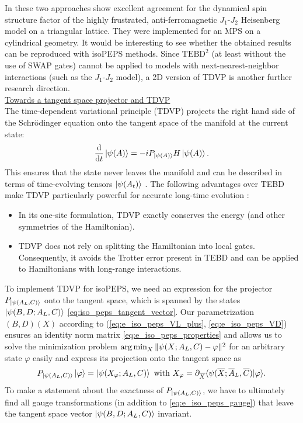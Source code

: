 In \cite{drescher2023dynamical} these two approaches show excellent agreement for the dynamical spin structure factor of the highly frustrated, anti-ferromagnetic $J_1$-$J_2$ Heisenberg model on a triangular lattice. They were implemented for an MPS on a cylindrical geometry. It would be interesting to see whether the obtained results can be reproduced with isoPEPS methods. Since $\text{TEBD}^2$ (at least without the use of SWAP gates) cannot be applied to models with next-nearest-neighbor interactions (such as the $J_1$-$J_2$ model), a 2D version of TDVP is another further research direction. \\[1em]

\noindent \underline{Towards a tangent space projector and TDVP} \\[0.5em]
The time-dependent variational principle (TDVP) projects the right hand side of the Schrödinger equation onto the tangent space of the manifold at the current state:
\begin{equation}
	\frac{\mathrm{d}}{\mathrm{d}t} \ket{\psi(A)} = -i P_{\ket{\psi(A)}} H \ket{\psi(A)}.
\end{equation}
This ensures that the state never leaves the manifold and can be described in terms of time-evolving tensors $\ket{\psi(A_t)}$ \cite{haegeman2016unifying}. The following advantages over TEBD make TDVP particularly powerful for accurate long-time evolution \cite{haegeman2013post}:
\begin{itemize}
	\item In its one-site formulation, TDVP exactly conserves the energy (and other symmetries of the Hamiltonian).
	\item TDVP does not rely on splitting the Hamiltonian into local gates. Consequently, it avoids the Trotter error present in TEBD and can be applied to Hamiltonians with long-range interactions. 
\end{itemize}
To implement TDVP for isoPEPS, we need an expression for the projector $P_{\ket{\psi(A_L, C)}}$ onto the tangent space, which is spanned by the states $\ket{\psi(B, D; A_L, C)}$ \eqref{eq:iso_peps_tangent_vector}. Our parametrization $(B, D)(X)$ according to (\ref{eq:e_iso_peps_VL_plus}, \ref{eq:e_iso_peps_VD}) ensures an identity norm matrix \eqref{eq:e_iso_peps_properties} and allows us to solve the minimization problem $\operatorname*{arg\,min}_X \Vert \psi(X; A_L, C) - \varphi \Vert^2$ for an arbitrary state $\varphi$ easily and express its projection onto the tangent space as
\begin{equation}
	P_{\ket{\psi(A_L, C)}} \ket{\varphi} = \ket{\psi(X_{\varphi}; A_L, C)}
	\text{ with } X_{\varphi} = \partial_{\overline{X}} \langle \psi(\overline{X}; \overline{A}_L, \overline{C}) \vert \varphi \rangle.
\end{equation}
To make a statement about the exactness of $P_{\ket{\psi(A_L, C)}}$, we have to ultimately find all gauge transformations (in addition to \eqref{eq:e_iso_peps_gauge}) that leave the tangent space vector $\ket{\psi(B, D; A_L, C)}$ invariant.